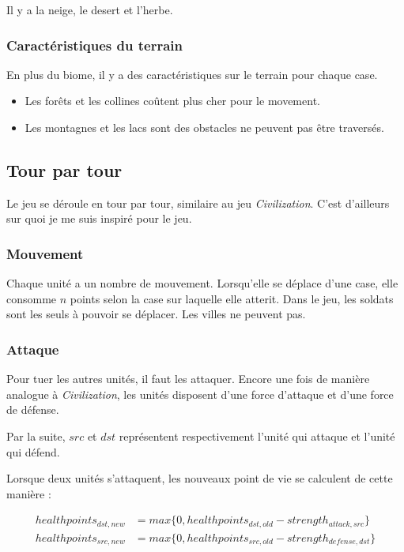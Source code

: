 \documentclass{article}
\begin{document}
Il y a la neige, le desert et l'herbe.

\subsubsection{Caractéristiques du terrain}
En plus du biome, il y a des caractéristiques sur le terrain pour chaque case.

\begin{itemize}
    \item Les forêts et les collines coûtent plus cher pour le movement.
    \item Les montagnes et les lacs sont des obstacles ne peuvent pas être traversés.
\end{itemize}

\subsection{Tour par tour}
Le jeu se déroule en tour par tour, similaire au jeu \textit{Civilization}. C'est d'ailleurs
sur quoi je me suis inspiré pour le jeu.

\subsubsection{Mouvement}

Chaque unité a un nombre de mouvement. Lorsqu'elle se déplace d'une case, elle consomme $n$ points selon la case sur laquelle elle atterit.
Dans le jeu, les soldats sont les seuls à pouvoir se déplacer. Les villes ne peuvent pas.

\subsubsection{Attaque}
Pour tuer les autres unités, il faut les attaquer. Encore une fois de manière analogue à \textit{Civilization},
les unités disposent d'une force d'attaque et d'une force de défense.

Par la suite, $src$ et $dst$ représentent respectivement l'unité qui attaque et l'unité
qui défend.

Lorsque deux unités s'attaquent, les nouveaux point de vie se calculent de cette manière : 

\begin{align}
    healthpoints_{dst,new} &= max \{0,healthpoints_{dst,old} - strength_{attack,src}\} \\
    healthpoints_{src,new} &= max \{0,healthpoints_{src,old} - strength_{defense,dst}\}
\end{align}
\end{document}
